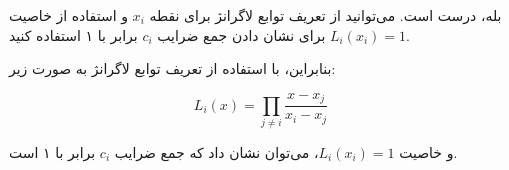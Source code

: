 بله، درست است. می‌توانید از تعریف توابع لاگرانژ برای نقطه \( x_i \) و استفاده از خاصیت \( L_i(x_i) = 1 \) برای نشان دادن جمع ضرایب \( c_i \) برابر با ۱ استفاده کنید. 

بنابراین، با استفاده از تعریف توابع لاگرانژ به صورت زیر:

\[ L_i(x) = \prod_{j \neq i} \frac{x - x_j}{x_i - x_j} \]

و خاصیت \( L_i(x_i) = 1 \)، می‌توان نشان داد که جمع ضرایب \( c_i \) برابر با ۱ است.